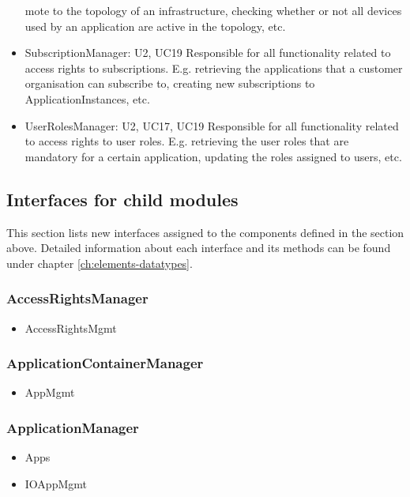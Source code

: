 \begin{itemize}
              mote to the topology of an infrastructure, checking whether or not all
              devices used by an application are active in the topology, etc.
        \item SubscriptionManager: U2, UC19
              Responsible for all functionality related to access rights to subscriptions.
              E.g. retrieving the applications that a customer organisation can subscribe to,
              creating new subscriptions to ApplicationInstances, etc.
        \item UserRolesManager: U2, UC17, UC19
              Responsible for all functionality related to access rights to user roles.
              E.g. retrieving the user roles that are mandatory for a certain application,
              updating the roles assigned to users, etc.
    \end{itemize}


\subsection{Interfaces for child modules}
    This section lists new interfaces assigned to the components defined
    in the section above. Detailed information about each interface and
    its methods can be found under chapter \ref{ch:elements-datatypes}. \\

    \subsubsection{AccessRightsManager}
        \begin{itemize}
            \item AccessRightsMgmt
        \end{itemize}

    \subsubsection{ApplicationContainerManager}
        \begin{itemize}
            \item AppMgmt
        \end{itemize}

    \subsubsection{ApplicationManager}
        \begin{itemize}
            \item Apps
            \item IOAppMgmt
        \end{itemize}

